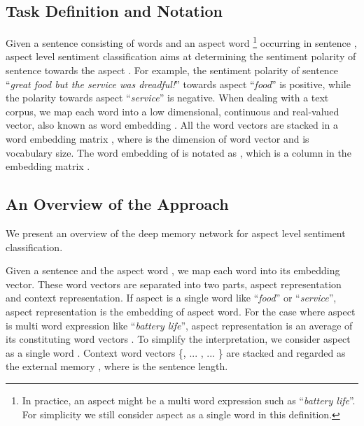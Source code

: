 \documentclass[11pt,letterpaper]{article}
\begin{document}
\subsection{Task Definition and Notation}
Given a sentence  consisting of  words and an aspect word  \footnote{In practice, an aspect might be a multi word expression such as ``\textit{battery life}''. For simplicity we still consider aspect as a single word in this definition.} occurring in sentence , aspect level sentiment classification aims at determining the sentiment polarity of sentence  towards the aspect . 
For example, the sentiment polarity of sentence ``\textit{great food but the service was dreadful!}''  towards aspect ``\textit{food}'' is positive, while the polarity towards aspect ``\textit{service}'' is negative. 
When dealing with a text corpus, we map each word into a low dimensional, continuous and real-valued vector, also known as word embedding \cite{Mikolov2013a,Pennington2014}.
All the word vectors are stacked in a word embedding matrix , where  is the dimension of word vector and  is vocabulary size.
The word embedding of  is notated as , which is a column in the embedding matrix . 





\subsection{An Overview of the Approach}
We present an overview of the deep memory network for aspect level sentiment classification. 


Given a sentence  and the aspect word , we map each word into its embedding vector. 
These word vectors are separated into two parts, aspect representation and context representation. 
If aspect is a single word like ``\textit{food}'' or ``\textit{service}'', aspect representation is the embedding of aspect word.
For the case where aspect is multi word expression like ``\textit{battery life}'', aspect representation is an average of its constituting word vectors \cite{Sun2015}. 
To simplify the interpretation, we consider aspect as a single word . 
Context word vectors \{,  ... ,   ... \} are stacked and regarded as the external memory , where  is the sentence length. 
\end{document}
